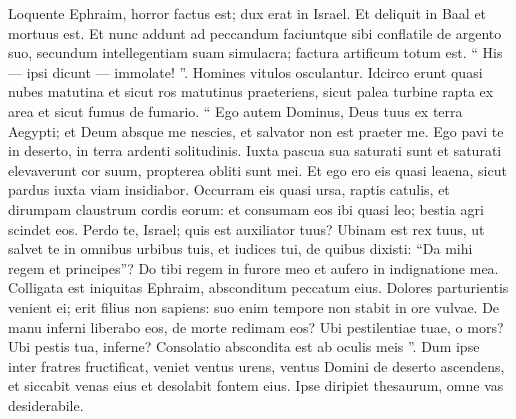 \begin{biblechapter}
\begin{biblechapter}
\begin{biblechapter}
\begin{biblechapter}
\begin{biblechapter}
\begin{biblechapter}
\begin{biblechapter}
\begin{biblechapter}
\begin{biblechapter}
\begin{biblechapter}
\begin{biblechapter}
\begin{biblechapter}
\begin{biblechapter}
 \verse Loquente Ephraim, horror factus est;
 dux erat in Israel.
 Et deliquit in Baal
 et mortuus est.
 \verse Et nunc addunt ad peccandum
 faciuntque sibi conflatile de argento suo,
 secundum intellegentiam suam simulacra;
 factura artificum totum est.
 “ His — ipsi dicunt — immolate! ”.
 Homines vitulos osculantur.
 \verse Idcirco erunt quasi nubes matutina
 et sicut ros matutinus praeteriens,
 sicut palea turbine rapta ex area
 et sicut fumus de fumario.
 \verse “ Ego autem Dominus, Deus tuus
 ex terra Aegypti;
 et Deum absque me nescies,
 et salvator non est praeter me.
 \verse Ego pavi te in deserto,
 in terra ardenti solitudinis.
 \verse Iuxta pascua sua saturati sunt
 et saturati elevaverunt cor suum,
 propterea obliti sunt mei.
 \verse Et ego ero eis quasi leaena,
 sicut pardus iuxta viam insidiabor.
 \verse Occurram eis quasi ursa, raptis catulis,
 et dirumpam claustrum cordis eorum:
 et consumam eos ibi quasi leo;
 bestia agri scindet eos.
 \verse Perdo te, Israel;
 quis est auxiliator tuus?
 \verse Ubinam est rex tuus,
 ut salvet te in omnibus urbibus tuis,
 et iudices tui, de quibus dixisti:
 “Da mihi regem et principes”?
 \verse Do tibi regem in furore meo
 et aufero in indignatione mea.
 \verse Colligata est iniquitas Ephraim,
 absconditum peccatum eius.
 \verse Dolores parturientis venient ei;
 erit filius non sapiens:
 suo enim tempore non stabit
 in ore vulvae.
 \verse De manu inferni liberabo eos,
 de morte redimam eos?
 Ubi pestilentiae tuae, o mors?
 Ubi pestis tua, inferne?
 Consolatio abscondita est ab oculis meis ”.
 \verse Dum ipse inter fratres fructificat,
 veniet ventus urens, ventus Domini
 de deserto ascendens,
 et siccabit venas eius
 et desolabit fontem eius.
 Ipse diripiet thesaurum,
 omne vas desiderabile.
 

\end{biblechapter}
\end{biblechapter}
\end{biblechapter}
\end{biblechapter}
\end{biblechapter}
\end{biblechapter}
\end{biblechapter}
\end{biblechapter}
\end{biblechapter}
\end{biblechapter}
\end{biblechapter}
\end{biblechapter}
\end{biblechapter}
